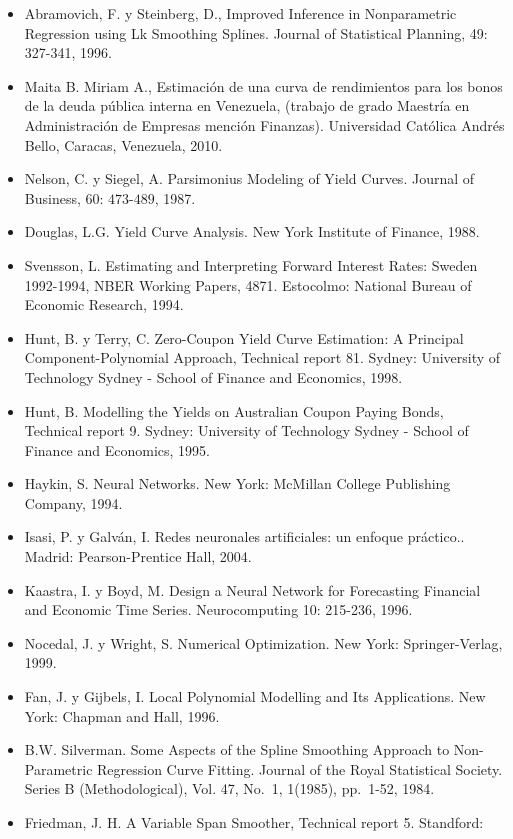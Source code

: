 \documentclass[
  12pt,
]{krantz}
\begin{document}
\begin{itemize}
\item
  Abramovich, F. y Steinberg, D., Improved Inference in Nonparametric Regression using Lk Smoothing Splines. Journal of Statistical Planning, 49: 327-341, 1996.
\item
  Maita B. Miriam A., Estimación de una curva de rendimientos para los bonos de la deuda pública interna en Venezuela, (trabajo de grado Maestría en Administración de Empresas mención Finanzas). Universidad Católica Andrés Bello, Caracas, Venezuela, 2010.
\item
  Nelson, C. y Siegel, A. Parsimonius Modeling of Yield Curves. Journal of
  Business, \(60\): \(473\)-\(489\), 1987.
\item
  Douglas, L.G. Yield Curve Analysis. New York Institute of Finance, 1988.
\item
  Svensson, L. Estimating and Interpreting Forward Interest Rates: Sweden 1992-1994, NBER Working Papers, 4871. Estocolmo: National Bureau of Economic Research, 1994.
\item
  Hunt, B. y Terry, C. Zero-Coupon Yield Curve Estimation: A Principal Component-Polynomial Approach, Technical report 81. Sydney: University of Technology Sydney - School of Finance and Economics, 1998.
\item
  Hunt, B. Modelling the Yields on Australian Coupon Paying Bonds, Technical report 9. Sydney: University of Technology Sydney - School of Finance and Economics, 1995.
\item
  Haykin, S. Neural Networks. New York: McMillan College Publishing Company, 1994.
\item
  Isasi, P. y Galván, I. Redes neuronales artificiales: un enfoque práctico.. Madrid: Pearson-Prentice Hall, 2004.
\item
  Kaastra, I. y Boyd, M. Design a Neural Network for Forecasting Financial and Economic Time Series. Neurocomputing 10: 215-236, 1996.
\item
  Nocedal, J. y Wright, S. Numerical Optimization. New York: Springer-Verlag, 1999.
\item
  Fan, J. y Gijbels, I. Local Polynomial Modelling and Its Applications. New York: Chapman and Hall, 1996.
\item
  B.W. Silverman. Some Aspects of the Spline Smoothing Approach to Non-Parametric Regression Curve Fitting. Journal of the Royal Statistical Society. Series B (Methodological), Vol. 47, No.~1, 1(1985), pp.~1-52, 1984.
\item
  Friedman, J. H. A Variable Span Smoother, Technical report 5. Standford:

\end{itemize}
\end{document}
